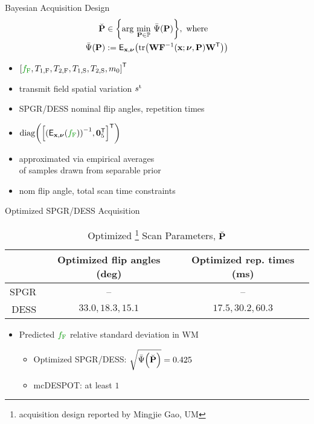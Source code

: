 \begin{frame}{Bayesian Acquisition Design}
	\begin{align}
    \breve{\bmP} &\in 
    	\set{%
        \argmin{\bmP \in \setP}
        \expcost\paren{\bmP}
    	}, \where \nonumber \\
		\expcost\paren{\bmP} &:=
    	\expect{\bmx,\bmnu}{\trace{\bmW \bmF^{-1}\paren{\bmx; \bmnu, \bmP} \bmW\tpose}}
  \end{align}
  \vspace{-0.5cm}
  \begin{itemize}
  	\item<2>{%
			\makebox[1.5cm][l]{$\bmx$} 
			$\brac{\hlg{\ff}, \tf{1}, \tf{2}, \ts{1}, \ts{2}, \mzero}\tpose$
		}%
		\item<2>{%
			\makebox[1.5cm][l]{$\bmnu$}
			transmit field spatial variation $s^{\mathrm{t}}$
		}%
		\item<2>{%
			\makebox[1.5cm][l]{$\bmP$}
			SPGR/DESS nominal flip angles, repetition times
		}%
		\item<3>{%
			\makebox[1.5cm][l]{$\bmW$}
			$\diag{\brac{\inv{\expect{\bmx,\bmnu}{\hlg{\ff}}}, \zeros{5}\tpose}\tpose}$
		}%
		\item<4>{%
			\makebox[1.5cm][l]{$\expect{\bmx,\bmnu}{\cdot}$}
			approximated via empirical averages \\
			\makebox[1.5cm][l]{}
			of samples drawn from separable prior
		}%
		\item<5>{%
			\makebox[1.5cm][l]{$\setP$}
			nom flip angle, total scan time constraints
		}%
  \end{itemize}
\end{frame}

\begin{frame}{Optimized SPGR/DESS Acquisition}
	\begin{table}[!tb]
    \centering
    \begin{tabular}{r | c | c}
      \hline
      \hline
      & Optimized flip angles (deg) & Optimized rep. times (ms) \\
      \hline
    	SPGR & -- 										& -- \\
    	DESS & $33.0,18.3,15.1$ 			& $17.5,30.2,60.3$ \\
      \hline
      \hline
    \end{tabular}
    \caption{%
    	Optimized
    	\footnote{%
				acquisition design reported by Mingjie Gao, UM
			} 
			Scan Parameters, $\breve{\mathbf{P}}$%
		}%
		\label{tab:mwf,acq}
	\end{table}
	\vspace{-0.5cm}
	\begin{itemize}
		\item{%
			Predicted $\hlg{\ff}$ relative standard deviation in WM
			\begin{itemize} 
				\item{%
					Optimized SPGR/DESS:
					$\sqrt{\expcost\paren{\breve{\bmP}}} = 0.425$
				}%
				\item{%
					mcDESPOT: 
					at least $1$ \hfill {}
				}%
			\end{itemize}
		}%
	\end{itemize}
\end{frame}

